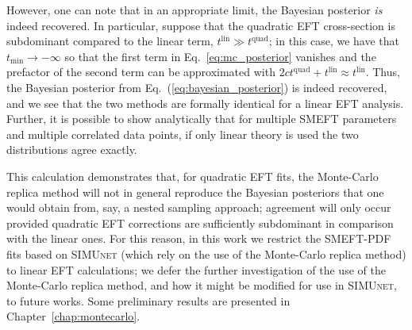 \documentclass[withindex,glossary]{cam-thesis}
\newcommand{\simunet}{\textsc{SIMUnet}}
\begin{document}
However, one can note that in an appropriate limit, the Bayesian posterior \textit{is} indeed recovered.
In particular, suppose that the quadratic EFT cross-section is subdominant
compared to the linear term, $t^{\text{lin}} \gg t^{\text{quad}}$; in this case, we have that
$t_{\text{min}} \rightarrow -\infty$ so that the first term in Eq.~\eqref{eq:mc_posterior} vanishes
and the prefactor of the second term can be approximated with $2ct^{\text{quad}} + t^{\text{lin}} \approx t^{\text{lin}}$. 
Thus, the Bayesian posterior from Eq.~(\ref{eq:bayesian_posterior}) is indeed recovered, and we 
see that the two methods are formally identical for a linear EFT analysis.
%
Further, it is possible to show analytically that for multiple SMEFT parameters and multiple correlated data points, 
if only linear theory is used the two distributions agree exactly.


This calculation demonstrates that, for quadratic EFT fits, the Monte-Carlo replica method
will not in general reproduce the Bayesian posteriors that one would obtain from, say, a 
nested sampling approach; agreement will only occur provided quadratic EFT corrections 
are sufficiently subdominant in comparison with the linear ones.
%
For this reason, in this work we restrict the SMEFT-PDF fits based on \simunet{} (which rely
on the use of the Monte-Carlo replica method) to linear EFT calculations;
we defer the further investigation of the use of the Monte-Carlo replica method, and how
it might be modified for use in \simunet{}, to future works. Some preliminary results are presented in Chapter~\ref{chap:montecarlo}.
\end{document}
